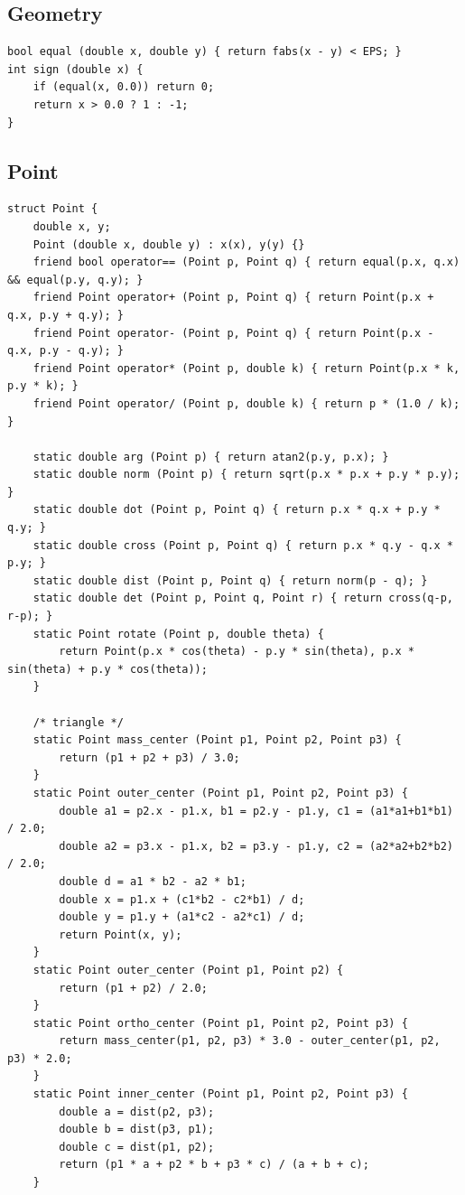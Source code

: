\documentclass[10pt,letterpaper,landscape]{article}
\begin{document}
\begin{multicols}{2}
\section{Geometry}
\begin{lstlisting}
bool equal (double x, double y) { return fabs(x - y) < EPS; }
int sign (double x) {
	if (equal(x, 0.0)) return 0;
	return x > 0.0 ? 1 : -1;
}
\end{lstlisting}
\subsection{Point}
\begin{lstlisting}
struct Point {
	double x, y;
	Point (double x, double y) : x(x), y(y) {}
	friend bool operator== (Point p, Point q) { return equal(p.x, q.x) && equal(p.y, q.y); }
	friend Point operator+ (Point p, Point q) { return Point(p.x + q.x, p.y + q.y); }
	friend Point operator- (Point p, Point q) { return Point(p.x - q.x, p.y - q.y); }
	friend Point operator* (Point p, double k) { return Point(p.x * k, p.y * k); }
	friend Point operator/ (Point p, double k) { return p * (1.0 / k); }

	static double arg (Point p) { return atan2(p.y, p.x); }
	static double norm (Point p) { return sqrt(p.x * p.x + p.y * p.y); }
	static double dot (Point p, Point q) { return p.x * q.x + p.y * q.y; }
	static double cross (Point p, Point q) { return p.x * q.y - q.x * p.y; }
	static double dist (Point p, Point q) { return norm(p - q); }
	static double det (Point p, Point q, Point r) { return cross(q-p, r-p); }
	static Point rotate (Point p, double theta) {
		return Point(p.x * cos(theta) - p.y * sin(theta), p.x * sin(theta) + p.y * cos(theta));
	}

	/* triangle */
	static Point mass_center (Point p1, Point p2, Point p3) {
		return (p1 + p2 + p3) / 3.0;
	}
	static Point outer_center (Point p1, Point p2, Point p3) {
		double a1 = p2.x - p1.x, b1 = p2.y - p1.y, c1 = (a1*a1+b1*b1) / 2.0;
		double a2 = p3.x - p1.x, b2 = p3.y - p1.y, c2 = (a2*a2+b2*b2) / 2.0;
		double d = a1 * b2 - a2 * b1;
		double x = p1.x + (c1*b2 - c2*b1) / d;
		double y = p1.y + (a1*c2 - a2*c1) / d;
		return Point(x, y);
	}
	static Point outer_center (Point p1, Point p2) {
		return (p1 + p2) / 2.0;
	}
	static Point ortho_center (Point p1, Point p2, Point p3) {
		return mass_center(p1, p2, p3) * 3.0 - outer_center(p1, p2, p3) * 2.0;
	}
	static Point inner_center (Point p1, Point p2, Point p3) {
		double a = dist(p2, p3);
		double b = dist(p3, p1);
		double c = dist(p1, p2);
		return (p1 * a + p2 * b + p3 * c) / (a + b + c);
	}


\end{lstlisting}
\end{multicols}
\end{document}

